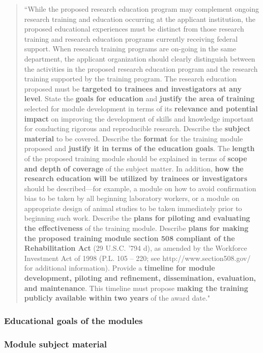 \documentclass[pdftex,english,12pt,parskip=half]{scrartcl}
\begin{document}
\begin{quotation}
``While the proposed research education program may complement ongoing research training and education occurring at the applicant institution, the proposed educational experiences must be distinct from those research training and research education programs currently receiving federal support. When research training programs are on-going in the same department, the applicant organization should clearly distinguish between the activities in the proposed research education program and the research training supported by the training program. The research education proposed must be \textbf{targeted to trainees and investigators at any level}. State the \textbf{goals for education} and \textbf{justify the area of training} selected for module development in terms of its \textbf{relevance and potential impact} on improving the development of skills and knowledge important for conducting rigorous and reproducible research. Describe the \textbf{subject material} to be covered.  Describe the \textbf{format} for the training module proposed and \textbf{justify it in terms of the education goals}.  The \textbf{length} of the proposed training module should be explained in terms of \textbf{scope and depth of coverage} of the subject matter.  In addition, \textbf{how the research education will be utilized by trainees or investigators} should be described---for example, a module on how to avoid confirmation bias to be taken by all beginning laboratory workers, or a module on appropriate design of animal studies to be taken immediately prior to beginning such work.  Describe the \textbf{plans for piloting and evaluating the effectiveness} of the training module. Describe \textbf{plans for making the proposed training module section 508 compliant of the Rehabilitation Act} (29 U.S.C. '794 d), as amended by the Workforce Investment Act of 1998 (P.L. 105 – 220; see http://www.section508.gov/ for additional information). Provide a \textbf{timeline for module development, piloting and refinement, dissemination, evaluation, and maintenance}.  This timeline must propose \textbf{making the training publicly available within two years} of the award date."
\end{quotation}

\subsubsection{Educational goals of the modules}

\subsubsection{Module subject material}
\end{document}
